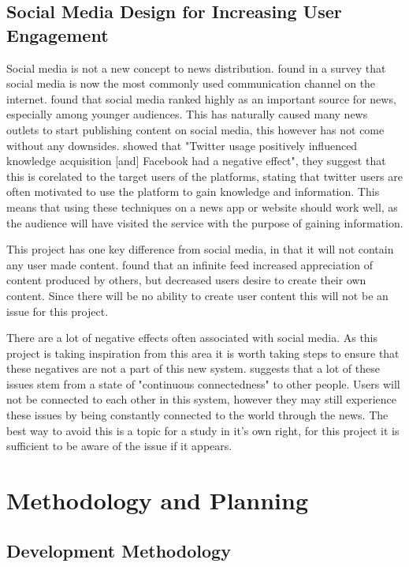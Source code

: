\documentclass[12pt,titlepage]{article}
\begin{document}
  \subsection{Social Media Design for Increasing User Engagement}

  Social media is not a new concept to news distribution. \cite{standley} found
  in a survey that social media is now the most commonly used communication
  channel on the internet. \cite{boukes} found that social media ranked highly
  as an important source for news, especially among younger audiences. This has
  naturally caused many news outlets to start publishing content on social
  media, this however has not come without any downsides. \cite{boukes} showed
  that "Twitter usage positively influenced knowledge acquisition [and] Facebook
  had a negative effect", they suggest that this is corelated to the target
  users of the platforms, stating that twitter users are often motivated to use
  the platform to gain knowledge and information. This means that using these
  techniques on a news app or website should work well, as the audience will have
  visited the service with the purpose of gaining information.

  This project has one key difference from social media, in that it will not
  contain any user made content. \cite{zhang} found that an infinite feed
  increased appreciation of content produced by others, but decreased users
  desire to create their own content. Since there will be no ability to create
  user content this will not be an issue for this project.

  There are a lot of negative effects often associated with social media. As
  this project is taking inspiration from this area it is worth taking steps to
  ensure that these negatives are not a part of this new system.
  \cite{lupinacci} suggests that a lot of these issues stem from a state of
  "continuous connectedness" to other people. Users will not be connected to
  each other in this system, however they may still experience these issues by
  being constantly connected to the world through the news. The best way to
  avoid this is a topic for a study in it's own right, for this project it is
  sufficient to be aware of the issue if it appears.

\section{Methodology and Planning}

  \subsection{Development Methodology}
\end{document}
